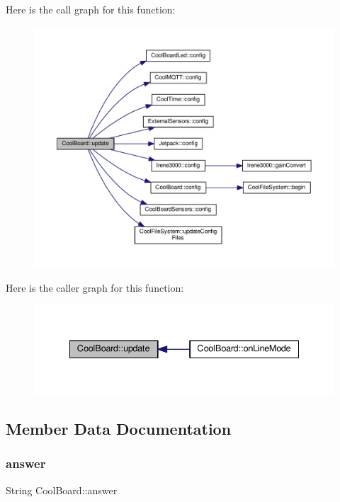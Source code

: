 Here is the call graph for this function\+:
\nopagebreak
\begin{figure}[H]
\begin{center}
\leavevmode
\includegraphics[width=350pt]{classCoolBoard_a8612756d3f73198cdde857a66f0fe690_cgraph}
\end{center}
\end{figure}
Here is the caller graph for this function\+:
\nopagebreak
\begin{figure}[H]
\begin{center}
\leavevmode
\includegraphics[width=335pt]{classCoolBoard_a8612756d3f73198cdde857a66f0fe690_icgraph}
\end{center}
\end{figure}


\subsection{Member Data Documentation}
\mbox{\label{classCoolBoard_a7b835fafd449e5282f7f91d787a2dc15}} 
\subsubsection{\texorpdfstring{answer}{answer}}
{\footnotesize\ttfamily String Cool\+Board\+::answer\hspace{0.3cm}{\ttfamily [private]}}




